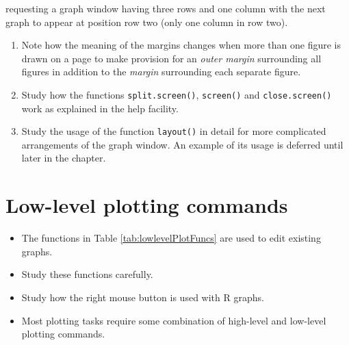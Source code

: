 \documentclass[
]{book}
\providecommand{\tightlist}{%
  \setlength{\itemsep}{0pt}\setlength{\parskip}{0pt}}
\begin{document}
requesting a graph window having three rows and one column with the next graph to appear at position row two (only one column in row two).

\begin{enumerate}
\def\labelenumi{(\alph{enumi})}
\setcounter{enumi}{2}
\item
  Note how the meaning of the margins changes when more than one figure is drawn on a page to make provision for an \emph{{outer margin}} surrounding all figures in addition to the \emph{{margin}} surrounding each separate figure.
\item
  Study how the functions \texttt{split.screen()}, \texttt{screen()} and \texttt{close.screen()} work as explained in the help facility.
\item
  Study the usage of the function \texttt{layout()} in detail for more complicated arrangements of the graph window. An example of its usage is deferred until later in the chapter.
\end{enumerate}

\section{Low-level plotting commands}\label{low-level-plotting-commands}

\begin{itemize}
\tightlist
\item
  The functions in Table \ref{tab:lowlevelPlotFuncs} are used to edit existing graphs.\\
\item
  Study these functions carefully.
\item
  Study how the right mouse button is used with R graphs.
\item
  Most plotting tasks require some combination of high-level and low-level plotting commands.
\end{itemize}
\end{document}
